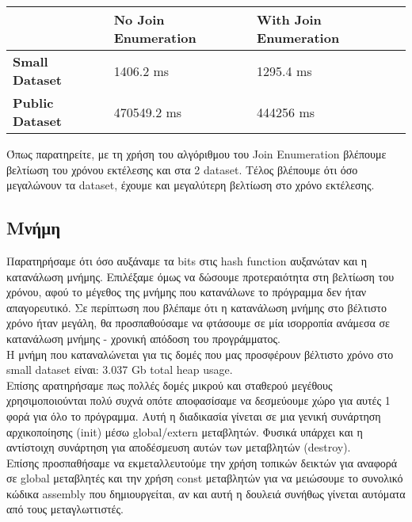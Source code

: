 \documentclass[12pt, a4paper]{article}
\begin{document}
\begin{table}[hbt!]
\centering
\begin{tabular}{|l|l|l|}
\hline
\multicolumn{1}{|c|}{\textbf{}} & \textbf{No Join Enumeration} & \textbf{With Join Enumeration} \\ \hline
\textbf{Small Dataset}          & 1406.2 ms                    & 1295.4 ms                      \\ \hline
\textbf{Public Dataset}         & 470549.2 ms                  & 444256 ms                      \\ \hline
\end{tabular}
\end{table}

Όπως παρατηρείτε, με τη χρήση του αλγόριθμου του Join Enumeration βλέπουμε βελτίωση του χρόνου εκτέλεσης και στα 2 dataset. Τέλος βλέπουμε ότι όσο μεγαλώνουν τα dataset, έχουμε και μεγαλύτερη βελτίωση στο χρόνο εκτέλεσης. 


\subsection{Μνήμη}

Παρατηρήσαμε ότι όσο αυξάναμε τα bits στις hash function αυξανώταν και η κατανάλωση μνήμης. Επιλέξαμε όμως να δώσουμε προτεραιότητα στη βελτίωση του χρόνου, αφού το μέγεθος της μνήμης που κατανάλωνε το πρόγραμμα δεν ήταν απαγορευτικό. Σε περίπτωση που βλέπαμε ότι η κατανάλωση μνήμης στο βέλτιστο χρόνο ήταν μεγάλη, θα προσπαθούσαμε να φτάσουμε σε μία ισορροπία ανάμεσα σε κατανάλωση μνήμης - χρονική απόδοση του προγράμματος.\\

Η μνήμη που καταναλώνεται για τις δομές που μας προσφέρουν βέλτιστο χρόνο στο small dataset είναι: 3.037 Gb total heap usage.  \\

Επίσης αρατηρήσαμε πως πολλές δομές μικρού και σταθερού μεγέθους χρησιμοποιούνται πολύ συχνά οπότε αποφασίσαμε να δεσμεύουμε χώρο για αυτές 1 φορά για όλο το πρόγραμμα. Αυτή η διαδικασία γίνεται σε μια γενική συνάρτηση αρχικοποίησης (init) μέσω global/extern μεταβλητών. Φυσικά υπάρχει και η αντίστοιχη συνάρτηση για αποδέσμευση αυτών των μεταβλητών (destroy).\\

Επίσης προσπαθήσαμε να εκμεταλλευτούμε την χρήση τοπικών δεικτών για αναφορά σε global μεταβλητές και την χρήση const μεταβλητών για να μειώσουμε το συνολικό κώδικα assembly που δημιουργείται, αν και αυτή η δουλειά συνήθως γίνεται αυτόματα από τους μεταγλωττιστές.\\
\end{document}
